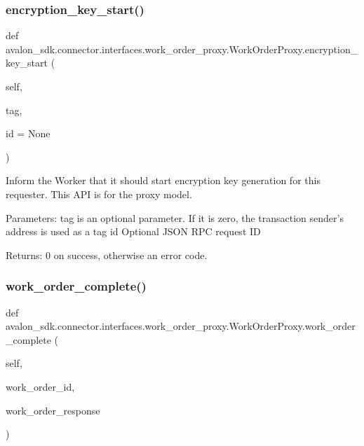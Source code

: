 \subsubsection{\texorpdfstring{encryption\+\_\+key\+\_\+start()}{encryption\_key\_start()}}
{\footnotesize\ttfamily def avalon\+\_\+sdk.\+connector.\+interfaces.\+work\+\_\+order\+\_\+proxy.\+Work\+Order\+Proxy.\+encryption\+\_\+key\+\_\+start (\begin{DoxyParamCaption}\item[{}]{self,  }\item[{}]{tag,  }\item[{}]{id = {\ttfamily None} }\end{DoxyParamCaption})}

\begin{DoxyVerb}Inform the Worker that it should start
encryption key generation for this requester.
This API is for the proxy model.

Parameters:
tag       is an optional parameter.
  If it is zero, the transaction sender's address
  is used as a tag
id        Optional JSON RPC request ID

Returns:
0 on success, otherwise an error code.
\end{DoxyVerb}
 \mbox{\label{classavalon__sdk_1_1connector_1_1interfaces_1_1work__order__proxy_1_1WorkOrderProxy_a8d0ab392d8e30c98f854f8cc87fee33c}} 
\subsubsection{\texorpdfstring{work\+\_\+order\+\_\+complete()}{work\_order\_complete()}}
{\footnotesize\ttfamily def avalon\+\_\+sdk.\+connector.\+interfaces.\+work\+\_\+order\+\_\+proxy.\+Work\+Order\+Proxy.\+work\+\_\+order\+\_\+complete (\begin{DoxyParamCaption}\item[{}]{self,  }\item[{}]{work\+\_\+order\+\_\+id,  }\item[{}]{work\+\_\+order\+\_\+response }\end{DoxyParamCaption})}

